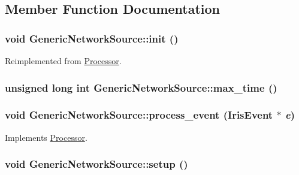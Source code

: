 \subsection{Member Function Documentation}
\hypertarget{classGenericNetworkSource_e875a5cd3f60bd3073812f747c80409e}{
\subsubsection[{init}]{\setlength{\rightskip}{0pt plus 5cm}void GenericNetworkSource::init ()}}
\label{classGenericNetworkSource_e875a5cd3f60bd3073812f747c80409e}




Reimplemented from \hyperlink{classProcessor_22e869ee49d974ad0ee7ee81961ab88f}{Processor}.\hypertarget{classGenericNetworkSource_a1970b5e7d100e15d282f03358c8ce70}{
\subsubsection[{max\_\-time}]{\setlength{\rightskip}{0pt plus 5cm}unsigned long int GenericNetworkSource::max\_\-time ()}}
\label{classGenericNetworkSource_a1970b5e7d100e15d282f03358c8ce70}


\hypertarget{classGenericNetworkSource_a67be5ac0f97b7e0b38eba909cecaa64}{
\subsubsection[{process\_\-event}]{\setlength{\rightskip}{0pt plus 5cm}void GenericNetworkSource::process\_\-event ({\bf IrisEvent} $\ast$ {\em e})}}
\label{classGenericNetworkSource_a67be5ac0f97b7e0b38eba909cecaa64}




Implements \hyperlink{classProcessor_18cdeefafbd8225cb3ad18dd098c0e08}{Processor}.\hypertarget{classGenericNetworkSource_a1390d4685120020d9b9564ee19df854}{
\subsubsection[{setup}]{\setlength{\rightskip}{0pt plus 5cm}void GenericNetworkSource::setup ()}}
\label{classGenericNetworkSource_a1390d4685120020d9b9564ee19df854}




